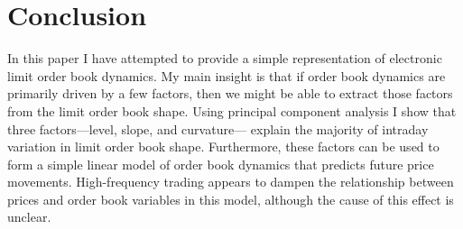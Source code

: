 \section{Conclusion}
	In this paper I have attempted to provide a simple representation of electronic limit order book dynamics. My main insight is that if order book dynamics are primarily driven by a few factors, then we might be able to extract those factors from the limit order book shape. Using principal component analysis I show that three factors---level, slope, and curvature--- explain the majority of intraday variation in limit order book shape. Furthermore, these factors can be used to form a simple linear model of order book dynamics that predicts future price movements. High-frequency trading appears to dampen the relationship between prices and order book variables in this model, although the cause of this effect is unclear.


